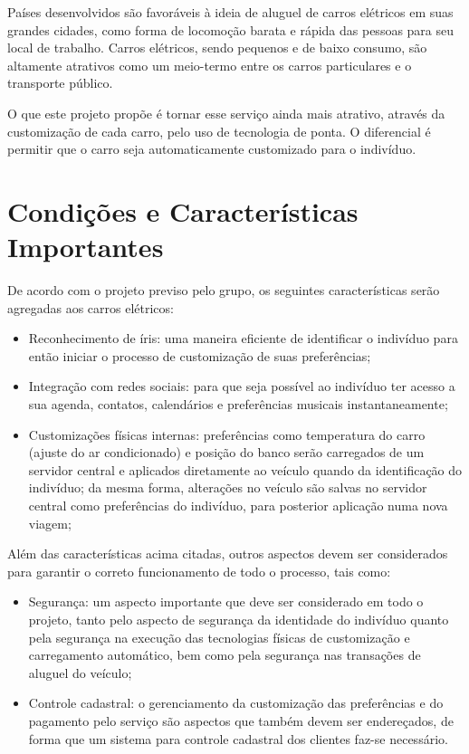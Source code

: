 \documentclass[12pt,journal,compsoc]{IEEEtran}
\begin{document}
Países desenvolvidos são favoráveis à ideia de aluguel de carros elétricos em suas grandes cidades, como forma de locomoção barata e rápida das pessoas para seu local de trabalho. Carros elétricos, sendo pequenos e de baixo consumo, são altamente atrativos como um meio-termo entre os carros particulares e o transporte público. 

O que este projeto propõe é tornar esse serviço ainda mais atrativo, através da customização de cada carro, pelo uso de tecnologia de ponta. O diferencial é permitir que o carro seja automaticamente customizado para o indivíduo. 


\section{Condições e Características Importantes}

De acordo com o projeto previso pelo grupo, os seguintes características serão agregadas aos carros elétricos:

\begin{itemize}

\item Reconhecimento de íris: uma maneira eficiente de identificar o indivíduo para então iniciar o processo de customização de suas preferências;

\item Integração com redes sociais: para que seja possível ao indivíduo ter acesso a sua agenda, contatos, calendários e preferências musicais instantaneamente; 

\item Customizações físicas internas: preferências como temperatura do carro (ajuste do ar condicionado) e posição do banco serão carregados de um servidor central e aplicados diretamente ao veículo quando da identificação do indivíduo; da mesma forma, alterações no veículo são salvas no servidor central como preferências do indivíduo, para posterior aplicação numa nova viagem;

\end{itemize}

Além das características acima citadas, outros aspectos devem ser considerados para garantir o correto funcionamento de todo o processo, tais como:

\begin{itemize}

\item Segurança: um aspecto importante que deve ser considerado em todo o projeto, tanto pelo aspecto de segurança da identidade do indivíduo quanto pela segurança na execução das tecnologias físicas de customização e carregamento automático, bem como pela segurança nas transações de aluguel do veículo;

\item Controle cadastral: o gerenciamento da customização das preferências e do pagamento pelo serviço são aspectos que também devem ser endereçados, de forma que um sistema para controle cadastral dos clientes faz-se necessário.

\end{itemize}
\end{document}
